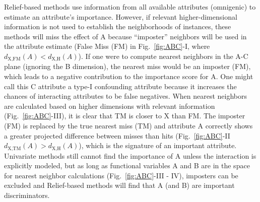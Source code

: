 \documentclass[10pt,letterpaper]{article}\usepackage[]{graphicx}\usepackage[]{color}
\begin{document}
Relief-based methods use information from all available attributes (omnigenic) to estimate an attribute's importance. However, if relevant higher-dimensional information is not used to establish the neighborhoods of instances, these methods will miss the effect of A because ``imposter'' neighbors will be used in the attribute estimate (False Miss (FM) in Fig.~\ref{fig:ABC}-I, where $d_{\text{X,FM}}(A)<d_{\text{X,H}}(A)$).  If one were to compute nearest neighbors in the A-C plane (ignoring the B dimension), the nearest miss would be an imposter (FM), which leads to a negative contribution to the importance score for A. One might call this C attribute a type-I confounding attribute because it increases the chances of interacting attributes to be false negatives. When nearest neighbors are calculated based on higher dimensions with relevant information (Fig.~\ref{fig:ABC}-III), it is clear that TM is closer to X than FM. The imposter (FM) is replaced by the true nearest miss (TM) and attribute A correctly shows a greater projected difference between misses than hits (Fig.~\ref{fig:ABC}-II $d_{\text{X,TM}}(A)>d_{\text{X,H}}(A)$), which is the signature of an important attribute. Univariate methods still cannot find the importance of A unless the interaction is explicitly modeled, but as long as functional variables A and B are in the space for nearest neighbor calculations (Fig.~\ref{fig:ABC}-III - IV), imposters can be excluded and Relief-based methods will find that A (and B) are important discriminators. 




\end{document}
